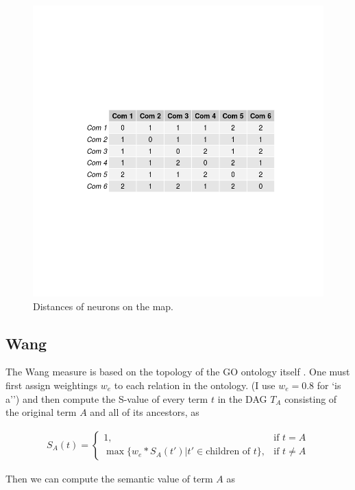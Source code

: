 \documentclass{report}
\begin{document}
	\begin{figure}
		\centering
		\includegraphics[width=\textwidth]{../shortest_path.png}
		\caption{Distances of neurons on the map.}
		\label{shortest_path}		
		
	\end{figure}
	

	
	\subsection{Wang}
	
	The Wang measure is based on the topology of the GO ontology itself \cite{wang2007new}. One must first assign weightings $w_e$ to each relation in the ontology. (I use $w_e=0.8$ for `is a'') and then compute the S-value of every term $t$ in the DAG $T_A$ consisting of the original term $A$ and all of its ancestors, as 
	
	\begin{align}
	S_A(t) = 
	\begin{cases}
	1, & \text{if } t = A \\
	\max\{w_e * S_A(t') | t' \in \text{children of }t\}, & \text{if }t\neq A
	\end{cases}
	\end{align} 
	
	Then we can compute the semantic value of term $A$ as 
	
\end{document}
